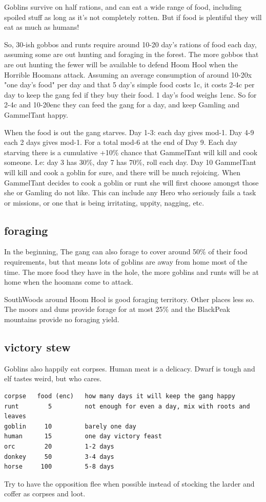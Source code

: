 Goblins survive on half rations, and can eat a wide range of food, including spoiled stuff as long as it's not completely rotten. But if food is plentiful they will eat as much as humans!

So, 30-ish gobbos and runts require around 10-20 day's rations of food each day, assuming some are out hunting and foraging in the forest. The more gobbos that are out hunting the fewer will be available to defend Hoom Hool when the Horrible Hoomans attack.
Assuming an average consumption of around 10-20x "one day's food" per day and that 5 day's simple food costs 1c, it costs 2-4c per day to keep the gang fed if they buy their food. 1 day's food weighs 1enc. So for 2-4c and 10-20enc they can feed the gang for a day, and keep Gamling and GammelTant happy.

When the food is out the gang starves. Day 1-3: each day gives mod-1. Day 4-9 each 2 days gives mod-1. For a total mod-6 at the end of Day 9.
Each day starving there is a cumulative +10\% chance that GammelTant will kill and cook someone. I.e: day 3 has 30\%, day 7 has 70\%, roll each day.
Day 10 GammelTant will kill and cook a goblin for sure, and there will be much rejoicing.
When GammelTant decides to cook a goblin or runt she will first choose amongst those she or Gamling do not like. This can include any Hero who seriously fails a task or missions, or one that is being irritating, uppity, nagging, etc.


\subsection*{foraging}

In the beginning, The gang can also forage to cover around 50\% of their food requirements, but that means lots of goblins are away from home most of the time. The more food they have in the hole, the more goblins and runts will be at home when the hoomans come to attack.

SouthWoods around Hoom Hool is good foraging territory. Other places less so. The moors and duns provide forage for at most 25\% and the BlackPeak mountains provide no foraging yield.


\subsection*{victory stew}

Goblins also happily eat corpses. Human meat is a delicacy. Dwarf is tough and elf tastes weird, but who cares.
\small \begin{samepage} \begin{verbatim}
corpse   food (enc)   how many days it will keep the gang happy
runt        5         not enough for even a day, mix with roots and leaves
goblin     10         barely one day
human      15         one day victory feast
orc        20         1-2 days
donkey     50         3-4 days
horse     100         5-8 days
\end{verbatim} \end{samepage} \normalsize
Try to have the opposition flee when possible instead of stocking the larder and coffer as corpses and loot.


